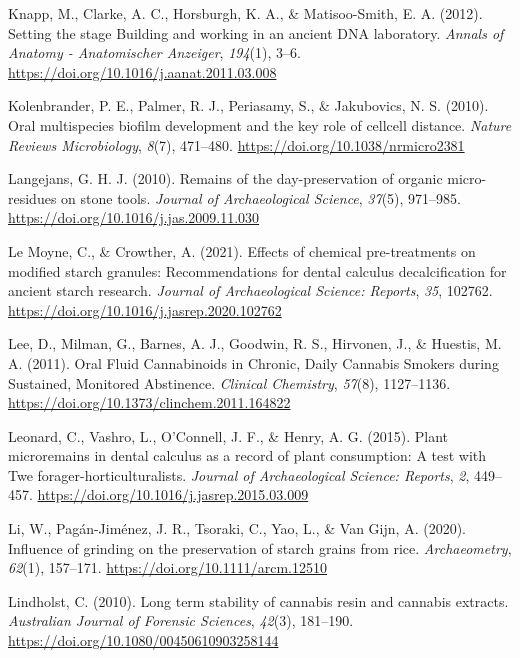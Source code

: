 \documentclass[
  b5paper,
]{book}
\newlength{\cslhangindent}
\newenvironment{CSLReferences}[2] %
 {\begin{list}{}{%
  \setlength{\itemindent}{0pt}
  \setlength{\leftmargin}{0pt}
  \setlength{\parsep}{0pt}
  \ifodd #1
   \setlength{\leftmargin}{\cslhangindent}
   \setlength{\itemindent}{-1\cslhangindent}
  \fi
  \setlength{\itemsep}{#2\baselineskip}}}
 {\end{list}}
\begin{document}
\begin{CSLReferences}{1}{0}
Knapp, M., Clarke, A. C., Horsburgh, K. A., \& Matisoo-Smith, E. A.
(2012). Setting the stage \textendash{} {Building} and working in an
ancient {DNA} laboratory. \emph{Annals of Anatomy - Anatomischer
Anzeiger}, \emph{194}(1), 3--6.
\url{https://doi.org/10.1016/j.aanat.2011.03.008}

Kolenbrander, P. E., Palmer, R. J., Periasamy, S., \& Jakubovics, N. S.
(2010). Oral multispecies biofilm development and the key role of
cell\textendash cell distance. \emph{Nature Reviews Microbiology},
\emph{8}(7), 471--480. \url{https://doi.org/10.1038/nrmicro2381}

Langejans, G. H. J. (2010). Remains of the day-preservation of organic
micro-residues on stone tools. \emph{Journal of Archaeological Science},
\emph{37}(5), 971--985. \url{https://doi.org/10.1016/j.jas.2009.11.030}

Le Moyne, C., \& Crowther, A. (2021). Effects of chemical pre-treatments
on modified starch granules: {Recommendations} for dental calculus
decalcification for ancient starch research. \emph{Journal of
Archaeological Science: Reports}, \emph{35}, 102762.
\url{https://doi.org/10.1016/j.jasrep.2020.102762}

Lee, D., Milman, G., Barnes, A. J., Goodwin, R. S., Hirvonen, J., \&
Huestis, M. A. (2011). Oral {Fluid Cannabinoids} in {Chronic}, {Daily
Cannabis Smokers} during {Sustained}, {Monitored Abstinence}.
\emph{Clinical Chemistry}, \emph{57}(8), 1127--1136.
\url{https://doi.org/10.1373/clinchem.2011.164822}

Leonard, C., Vashro, L., O'Connell, J. F., \& Henry, A. G. (2015). Plant
microremains in dental calculus as a record of plant consumption: {A}
test with {Twe} forager-horticulturalists. \emph{Journal of
Archaeological Science: Reports}, \emph{2}, 449--457.
\url{https://doi.org/10.1016/j.jasrep.2015.03.009}

Li, W., Pagán-Jiménez, J. R., Tsoraki, C., Yao, L., \& Van Gijn, A.
(2020). Influence of grinding on the preservation of starch grains from
rice. \emph{Archaeometry}, \emph{62}(1), 157--171.
\url{https://doi.org/10.1111/arcm.12510}

Lindholst, C. (2010). Long term stability of cannabis resin and cannabis
extracts. \emph{Australian Journal of Forensic Sciences}, \emph{42}(3),
181--190. \url{https://doi.org/10.1080/00450610903258144}


\end{CSLReferences}
\end{document}

